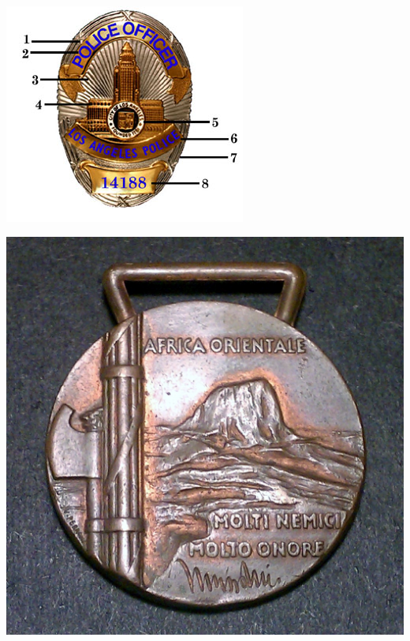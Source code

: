 \begin{frame}
    \centering
    \includegraphics[width=.9\textwidth]{img/fasces/badge_description.jpg} \\
\end{frame}
\begin{frame}
    \centering
    \includegraphics[width=.9\textwidth]{img/fasces/coin.jpg} \\
\end{frame}
